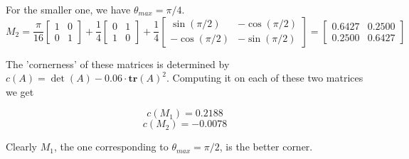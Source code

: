 \documentclass[11pt,english]{article}
\begin{document}
\begin{enumerate}
For the smaller one, we have $\theta_{max} = \pi/4$. 
\[
M_2 = \frac{\pi}{16} 
\begin{bmatrix}
    1 & 0 \\
    0 & 1
\end{bmatrix} + \frac{1}{4} 
\begin{bmatrix}
    0 & 1 \\
    1 & 0
\end{bmatrix} + \frac{1}{4} 
\begin{bmatrix}
    \sin (\pi/2)  & -\cos (\pi/2) \\
    -\cos (\pi/2) & -\sin (\pi/2) 
\end{bmatrix}
= \begin{bmatrix}
    0.6427 & 0.2500 \\
    0.2500 & 0.6427
\end{bmatrix} \]

The 'cornerness' of these matrices is determined by $c(A) = \det(A) - 0.06 \cdot \mathbf{tr}(A)^2$. Computing it on
each of these two matrices we get

\[c(M_1) = 0.2188\]
\[ c(M_2) = -0.0078 \]

Clearly $M_1$, the one
corresponding to $\theta_{max} = \pi/2$, is the better corner. 



\end{enumerate}
\end{document}
